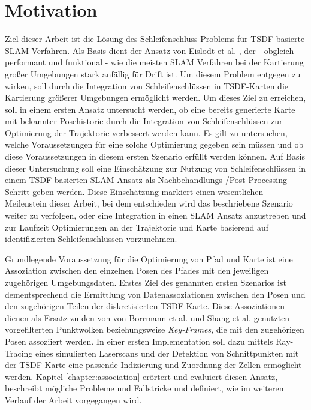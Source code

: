 \section{Motivation}

Ziel dieser Arbeit ist die Lösung des Schleifenschluss Problems für TSDF basierte SLAM Verfahren.
Als Basis dient der Ansatz von Eislodt et al. \cite{HATSDF}, der - obgleich performant und funktional - wie die meisten SLAM Verfahren bei der Kartierung großer Umgebungen stark anfällig für Drift ist. Um diesem Problem entgegen zu wirken, soll durch die Integration von Schleifenschlüssen in TSDF-Karten die Kartierung größerer Umgebungen ermöglicht werden.
Um dieses Ziel zu erreichen, soll in einem ersten Ansatz untersucht werden, ob eine bereits generierte Karte mit bekannter Posehistorie durch die Integration von Schleifenschlüssen zur Optimierung der Trajektorie verbessert werden kann.
Es gilt zu untersuchen, welche Voraussetzungen für eine solche Optimierung gegeben sein müssen und ob diese Voraussetzungen in diesem ersten Szenario erfüllt werden können.
Auf Basis dieser Untersuchung soll eine Einschätzung zur Nutzung von Schleifenschlüssen in einem TSDF basierten SLAM Ansatz als Nachbehandlungs-/Post-Processing-Schritt geben werden.
Diese Einschätzung markiert einen wesentlichen Meilenstein dieser Arbeit, bei dem entschieden wird das beschriebene Szenario weiter zu verfolgen, oder eine Integration in einen SLAM Ansatz anzustreben und zur Laufzeit Optimierungen an der Trajektorie und Karte basierend auf identifizierten Schleifenschlüssen vorzunehmen.

Grundlegende Voraussetzung für die Optimierung von Pfad und Karte ist eine Assoziation zwischen den einzelnen Posen des Pfades mit den jeweiligen zugehörigen Umgebungsdaten.
Erstes Ziel des genannten ersten Szenarios ist dementsprechend die Ermittlung von Datenassoziationen zwischen den Posen und den zugehörigen Teilen der diskretisierten TSDF-Karte.
Diese Assoziationen dienen als Ersatz zu den von von Borrmann et al. \cite{borrmann2008globally} und Shang et al. \cite{shan2020lio} genutzten vorgefilterten Punktwolken beziehungsweise \emph{Key-Frames}, die mit den zugehörigen Posen assoziiert werden.
In einer ersten Implementation soll dazu mittels Ray-Tracing eines simulierten Laserscans und der Detektion von Schnittpunkten mit der TSDF-Karte eine passende Indizierung und Zuordnung der Zellen ermöglicht werden.
Kapitel \ref{chapter:association} erörtert und evaluiert diesen Ansatz, beschreibt mögliche Probleme und Fallstricke und definiert, wie im weiteren Verlauf der Arbeit vorgegangen wird.

